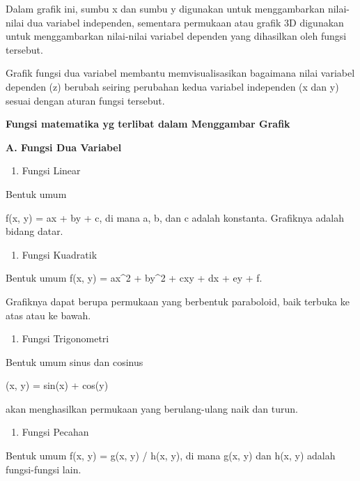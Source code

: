 \documentclass[
]{book}
\providecommand{\tightlist}{%
  \setlength{\itemsep}{0pt}\setlength{\parskip}{0pt}}
\begin{document}
Dalam grafik ini, sumbu x dan sumbu y digunakan untuk menggambarkan nilai-nilai dua variabel independen, sementara permukaan atau grafik 3D digunakan untuk menggambarkan nilai-nilai variabel dependen yang dihasilkan oleh fungsi tersebut.

Grafik fungsi dua variabel membantu memvisualisasikan bagaimana nilai variabel dependen (z) berubah seiring perubahan kedua variabel independen (x dan y) sesuai dengan aturan fungsi tersebut.

\textbf{Fungsi matematika yg terlibat dalam Menggambar Grafik}

\textbf{A. Fungsi Dua Variabel}

\begin{enumerate}
\def\labelenumi{\arabic{enumi}.}
\tightlist
\item
  Fungsi Linear
\end{enumerate}

Bentuk umum

f(x, y) = ax + by + c, di mana a, b, dan c adalah konstanta. Grafiknya adalah bidang datar.

\begin{enumerate}
\def\labelenumi{\arabic{enumi}.}
\setcounter{enumi}{1}
\tightlist
\item
  Fungsi Kuadratik
\end{enumerate}

Bentuk umum f(x, y) = ax\^{}2 + by\^{}2 + cxy + dx + ey + f.

Grafiknya dapat berupa permukaan yang berbentuk paraboloid, baik terbuka ke atas atau ke bawah.

\begin{enumerate}
\def\labelenumi{\arabic{enumi}.}
\setcounter{enumi}{2}
\tightlist
\item
  Fungsi Trigonometri
\end{enumerate}

Bentuk umum sinus dan cosinus

(x, y) = sin(x) + cos(y)

akan menghasilkan permukaan yang berulang-ulang naik dan turun.

\begin{enumerate}
\def\labelenumi{\arabic{enumi}.}
\setcounter{enumi}{3}
\tightlist
\item
  Fungsi Pecahan
\end{enumerate}

Bentuk umum f(x, y) = g(x, y) / h(x, y), di mana g(x, y) dan h(x, y) adalah fungsi-fungsi lain.
\end{document}
